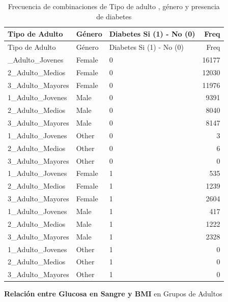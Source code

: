 \documentclass[
]{article}
\begin{document}
\begin{longtable}[]{@{}lllr@{}}
\caption{Frecuencia de combinaciones de Tipo de adulto , género y
presencia de diabetes}\tabularnewline
\toprule\noalign{}
Tipo de Adulto & Género & Diabetes Si (1) - No (0) & Freq \\
\midrule\noalign{}
\endfirsthead
\toprule\noalign{}
Tipo de Adulto & Género & Diabetes Si (1) - No (0) & Freq \\
\midrule\noalign{}
\endhead
\bottomrule\noalign{}
\endlastfoot
1\_Adulto\_Jovenes & Female & 0 & 16177 \\
2\_Adulto\_Medios & Female & 0 & 12030 \\
3\_Adulto\_Mayores & Female & 0 & 11976 \\
1\_Adulto\_Jovenes & Male & 0 & 9391 \\
2\_Adulto\_Medios & Male & 0 & 8040 \\
3\_Adulto\_Mayores & Male & 0 & 8147 \\
1\_Adulto\_Jovenes & Other & 0 & 3 \\
2\_Adulto\_Medios & Other & 0 & 6 \\
3\_Adulto\_Mayores & Other & 0 & 0 \\
1\_Adulto\_Jovenes & Female & 1 & 535 \\
2\_Adulto\_Medios & Female & 1 & 1239 \\
3\_Adulto\_Mayores & Female & 1 & 2604 \\
1\_Adulto\_Jovenes & Male & 1 & 417 \\
2\_Adulto\_Medios & Male & 1 & 1222 \\
3\_Adulto\_Mayores & Male & 1 & 2328 \\
1\_Adulto\_Jovenes & Other & 1 & 0 \\
2\_Adulto\_Medios & Other & 1 & 0 \\
3\_Adulto\_Mayores & Other & 1 & 0 \\
\end{longtable}

\textbf{Relación entre Glucosa en Sangre y BMI} en Grupos de Adultos
\end{document}
